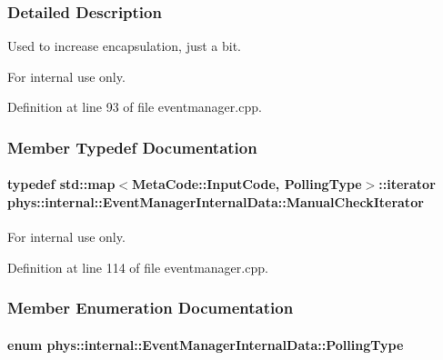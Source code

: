 \subsubsection{Detailed Description}
Used to increase encapsulation, just a bit. \begin{DoxyInternal}{For internal use only.}
\end{DoxyInternal}


Definition at line 93 of file eventmanager.cpp.



\subsubsection{Member Typedef Documentation}
\hypertarget{structphys_1_1internal_1_1EventManagerInternalData_ad2b9c7924f32e299846f1d945cb82dc0}{
\paragraph[{ManualCheckIterator}]{\setlength{\rightskip}{0pt plus 5cm}typedef std::map$<${\bf MetaCode::InputCode}, {\bf PollingType}$>$::iterator {\bf phys::internal::EventManagerInternalData::ManualCheckIterator}}\hfill}
\label{d6/d3a/structphys_1_1internal_1_1EventManagerInternalData_ad2b9c7924f32e299846f1d945cb82dc0}
\begin{DoxyInternal}{For internal use only.}
\end{DoxyInternal}


Definition at line 114 of file eventmanager.cpp.



\subsubsection{Member Enumeration Documentation}
\hypertarget{structphys_1_1internal_1_1EventManagerInternalData_ab9ab8380b84448aacf46a63050e159af}{
\paragraph[{PollingType}]{\setlength{\rightskip}{0pt plus 5cm}enum {\bf phys::internal::EventManagerInternalData::PollingType}}\hfill}
\label{d6/d3a/structphys_1_1internal_1_1EventManagerInternalData_ab9ab8380b84448aacf46a63050e159af}


